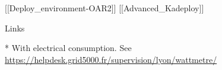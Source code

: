 \documentclass[final]{beamer}
\newlength{\threecolwid}
\begin{document}
\begin{frame}[t]
\begin{columns}[t]
\begin{column}{\threecolwid}
\begin{alertblock}{[[Deploy\_environment-OAR2]] [[Advanced\_Kadeploy]]}

\end{alertblock}



\begin{alertblock}{Links}

\end{alertblock}


* With electrical consumption.
See \url{https://helpdesk.grid5000.fr/supervision/lyon/wattmetre/}

\end{column} %

\end{columns} %

\end{frame} %
\end{document}

